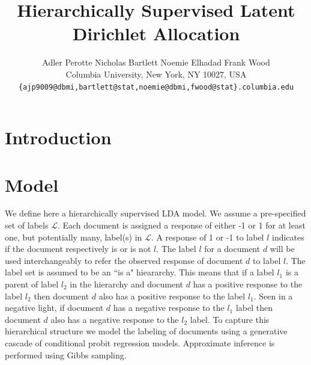 \documentclass{article}
\title{Hierarchically Supervised Latent Dirichlet Allocation}
\author{
Adler Perotte\hspace{1cm} Nicholas Bartlett \hspace{1cm} Noemie Elhadad \hspace{1cm} Frank Wood\\
Columbia University, New York, NY 10027, USA \\
\texttt{\{ajp9009@dbmi,bartlett@stat,noemie@dbmi,fwood@stat\}.columbia.edu}
}
\begin{document}
\maketitle

\begin{abstract}

\end{abstract}

\section{Introduction}
\label{sec:introduction}




\section{Model}
\label{sec:model}
We define here a hierarchically supervised LDA model.  We assume a pre-specified set of labels $\mathcal{L}$. Each document is assigned a response of either -1 or 1 for at least one, but potentially many, label(s) in $\mathcal{L}$.  A response of 1 or -1 to label $l$ indicates if the document respectively is or is not $l$.  The label $l$ for a document $d$ will be used interchangeably to refer the observed response of document $d$ to label $l$. The label set is assumed to be an ``is a" hieararchy.  This means that if a label $l_1$ is a parent of label $l_2$ in the hierarchy and document $d$ has a positive response to the label $l_2$ then document $d$ also has a positive response to the label $l_1$.  Seen in a negative light, if document $d$ has a negative response to the $l_1$ label then document $d$ also has a negative response to the $l_2$ label.  To capture this hierarchical structure we model the labeling of documents using a generative cascade of conditional probit regression models.  Approximate inference is performed using Gibbs sampling.
\end{document}

